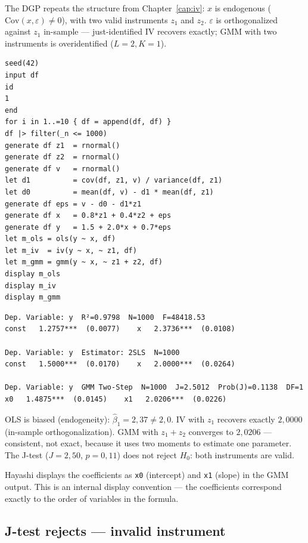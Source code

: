 The DGP repeats the structure from Chapter~\ref{cap:iv}: $x$ is endogenous ($\mathrm{Cov}(x,\varepsilon)
\neq 0$), with two valid instruments $z_1$ and $z_2$. $\varepsilon$ is
orthogonalized against $z_1$ in-sample --- just-identified IV recovers
exactly; GMM with two instruments is overidentified ($L=2, K=1$).

\begin{lstlisting}[caption={GMM DGP --- biased OLS, exact IV, efficient GMM}]
seed(42)
input df
id
1
end
for i in 1..=10 { df = append(df, df) }
df |> filter(_n <= 1000)
generate df z1  = rnormal()
generate df z2  = rnormal()
generate df v   = rnormal()
let d1          = cov(df, z1, v) / variance(df, z1)
let d0          = mean(df, v) - d1 * mean(df, z1)
generate df eps = v - d0 - d1*z1
generate df x   = 0.8*z1 + 0.4*z2 + eps
generate df y   = 1.5 + 2.0*x + 0.7*eps
let m_ols = ols(y ~ x, df)
let m_iv  = iv(y ~ x, ~ z1, df)
let m_gmm = gmm(y ~ x, ~ z1 + z2, df)
display m_ols
display m_iv
display m_gmm
\end{lstlisting}

\begin{lstlisting}[language={}, basicstyle=\ttfamily\scriptsize,
  frame=none, numbers=none, backgroundcolor=\color{codbg},
  xleftmargin=0pt, xrightmargin=0pt, breaklines=false]
Dep. Variable: y  R²=0.9798  N=1000  F=48418.53
const   1.2757***  (0.0077)    x   2.3736***  (0.0108)

Dep. Variable: y  Estimator: 2SLS  N=1000
const   1.5000***  (0.0170)    x   2.0000***  (0.0264)

Dep. Variable: y  GMM Two-Step  N=1000  J=2.5012  Prob(J)=0.1138  DF=1
x0   1.4875***  (0.0145)    x1   2.0206***  (0.0226)
\end{lstlisting}

OLS is biased (endogeneity): $\hat\beta_1 = 2{,}37 \neq 2{,}0$. IV with $z_1$
recovers exactly $2{,}0000$ (in-sample orthogonalization). GMM with $z_1 + z_2$
converges to $2{,}0206$ --- consistent, not exact, because it uses two moments to
estimate one parameter. The J-test ($J = 2{,}50$, $p = 0{,}11$) does not reject
$H_0$: both instruments are valid.

\begin{nota}
  Hayashi displays the coefficients as \texttt{x0} (intercept) and \texttt{x1}
  (slope) in the GMM output. This is an internal display convention ---
  the coefficients correspond exactly to the order of variables in the formula.
\end{nota}

\subsection*{J-test rejects --- invalid instrument}

